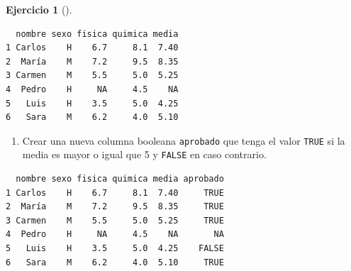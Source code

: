 \documentclass[
  a4paper,
]{scrreport}
\newenvironment{Shaded}{\begin{snugshade}}{\end{snugshade}}
\newcommand{\DecValTok}[1]{\textcolor[rgb]{0.68,0.00,0.00}{#1}}
\newcommand{\NormalTok}[1]{\textcolor[rgb]{0.00,0.23,0.31}{#1}}
\newcommand{\OtherTok}[1]{\textcolor[rgb]{0.00,0.23,0.31}{#1}}
\newcommand{\SpecialCharTok}[1]{\textcolor[rgb]{0.37,0.37,0.37}{#1}}
\providecommand{\tightlist}{%
  \setlength{\itemsep}{0pt}\setlength{\parskip}{0pt}}\usepackage{longtable,booktabs,array}
\theoremstyle{definition}
\newtheorem{exercise}{Ejercicio}[chapter]
\theoremstyle{remark}
\begin{document}
\begin{exercise}[]
\begin{tcolorbox}
\begin{Shaded}
\end{Shaded}

\begin{verbatim}
  nombre sexo fisica quimica media
1 Carlos    H    6.7     8.1  7.40
2  María    M    7.2     9.5  8.35
3 Carmen    M    5.5     5.0  5.25
4  Pedro    H     NA     4.5    NA
5   Luis    H    3.5     5.0  4.25
6   Sara    M    6.2     4.0  5.10
\end{verbatim}

\end{tcolorbox}

\begin{enumerate}
\def\labelenumi{\alph{enumi}.}
\setcounter{enumi}{4}
\tightlist
\item
  Crear una nueva columna booleana \texttt{aprobado} que tenga el valor
  \texttt{TRUE} si la media es mayor o igual que 5 y \texttt{FALSE} en
  caso contrario.
\end{enumerate}

\begin{tcolorbox}[enhanced jigsaw, breakable, arc=.35mm, leftrule=.75mm, toptitle=1mm, opacitybacktitle=0.6, opacityback=0, title=\textcolor{quarto-callout-tip-color}{\faLightbulb}\hspace{0.5em}{Solución}, colframe=quarto-callout-tip-color-frame, titlerule=0mm, bottomtitle=1mm, colback=white, bottomrule=.15mm, colbacktitle=quarto-callout-tip-color!10!white, toprule=.15mm, rightrule=.15mm, left=2mm, coltitle=black]

\begin{Shaded}
\end{Shaded}

\begin{verbatim}
  nombre sexo fisica quimica media aprobado
1 Carlos    H    6.7     8.1  7.40     TRUE
2  María    M    7.2     9.5  8.35     TRUE
3 Carmen    M    5.5     5.0  5.25     TRUE
4  Pedro    H     NA     4.5    NA       NA
5   Luis    H    3.5     5.0  4.25    FALSE
6   Sara    M    6.2     4.0  5.10     TRUE
\end{verbatim}


\end{tcolorbox}
\end{exercise}
\end{document}
